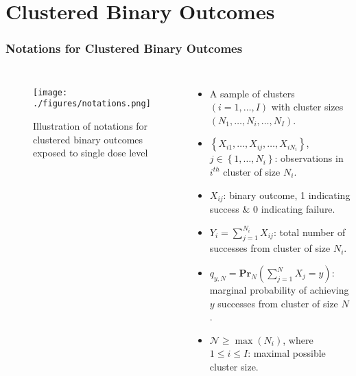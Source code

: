 \documentclass[hyperref={bookmarks=false},aspectratio=169]{beamer}
\begin{document}
\section{Clustered Binary Outcomes}

\begin{frame}
\frametitle{Notations for Clustered Binary Outcomes}

\begin{columns}


\begin{figure}
    \centering
    \texttt{[image: ./figures/notations.png]}
    \caption{Illustration of notations for clustered binary outcomes exposed to single dose level}
    \label{fig:notations}
\end{figure}

\begin{itemize}
    \item A sample of clusters $(i = 1, \dots, I)$ with cluster sizes $(N_1, \dots, N_i, \dots, N_I)$.
    \item $\left\lbrace X_{i1}, \dots, X_{ij}, \dots, X_{iN_i} \right\rbrace$, $j \in \left\lbrace 1, \dots, N_i \right\rbrace$: observations in $i^{th}$ cluster of size $N_i$.
    \item $X_{ij}$: binary outcome, 1 indicating success {\&} 0 indicating failure.
    \item $Y_i = \sum_{j=1}^{N_i} X_{ij}$: total number of successes from cluster of size $N_i$.
    \item $q_{y,N} = \textbf{Pr}_N(\sum_{j=1}^{N} X_j = y)$: marginal probability of achieving $y$ successes from cluster of size $N$.
    \item $\mathcal{N} \geq \max{(N_{i})}$, where $1 \leq i \leq I$: maximal possible cluster size.
\end{itemize}

\end{columns}
\end{frame}
\end{document}
